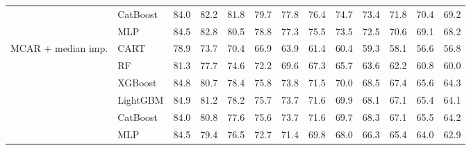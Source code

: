 \begin{table}[p]
\begin{tabular}{@{}llrrrrrrrrrrr@{}}
 & CatBoost & 84.0 & 82.2 & 81.8 & 79.7 & 77.8 & 76.4 & 74.7 & 73.4 & 71.8 & 70.4 & 69.2 \\
 & MLP & 84.5 & 82.8 & 80.5 & 78.8 & 77.3 & 75.5 & 73.5 & 72.5 & 70.6 & 69.1 & 68.2 \\
\midrule
MCAR + median imp. & CART & 78.9 & 73.7 & 70.4 & 66.9 & 63.9 & 61.4 & 60.4 & 59.3 & 58.1 & 56.6 & 56.8 \\
 & RF & 81.3 & 77.7 & 74.6 & 72.2 & 69.6 & 67.3 & 65.7 & 63.6 & 62.2 & 60.8 & 60.0 \\
 & XGBoost & 84.8 & 80.7 & 78.4 & 75.8 & 73.8 & 71.5 & 70.0 & 68.5 & 67.4 & 65.6 & 64.3 \\
 & LightGBM & 84.9 & 81.2 & 78.2 & 75.7 & 73.7 & 71.6 & 69.9 & 68.1 & 67.1 & 65.4 & 64.1 \\
 & CatBoost & 84.0 & 80.8 & 77.6 & 75.6 & 73.7 & 71.6 & 69.7 & 68.3 & 67.1 & 65.5 & 64.2 \\
 & MLP & 84.5 & 79.4 & 76.5 & 72.7 & 71.4 & 69.8 & 68.0 & 66.3 & 65.4 & 64.0 & 62.9 \\
\bottomrule
\end{tabular}
\end{table}

